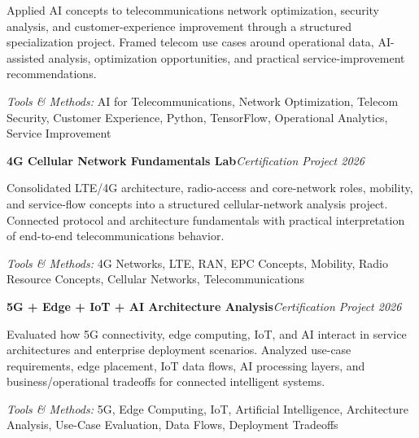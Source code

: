 \documentclass[9pt,letterpaper]{extarticle}
\newcommand{\entry}[2]{\Needspace{4\baselineskip}\textbf{#1}\hfill\textit{#2}\par}
\begin{document}
Applied AI concepts to telecommunications network optimization, security analysis, and customer-experience improvement through a structured specialization project. Framed telecom use cases around operational data, AI-assisted analysis, optimization opportunities, and practical service-improvement recommendations.\par
{\small\textit{Tools \& Methods:} AI for Telecommunications, Network Optimization, Telecom Security, Customer Experience, Python, TensorFlow, Operational Analytics, Service Improvement\par}
\vspace{1pt}
\entry{4G Cellular Network Fundamentals Lab}{Certification Project \textbar{} 2026}
Consolidated LTE/4G architecture, radio-access and core-network roles, mobility, and service-flow concepts into a structured cellular-network analysis project. Connected protocol and architecture fundamentals with practical interpretation of end-to-end telecommunications behavior.\par
{\small\textit{Tools \& Methods:} 4G Networks, LTE, RAN, EPC Concepts, Mobility, Radio Resource Concepts, Cellular Networks, Telecommunications\par}
\vspace{1pt}
\entry{5G + Edge + IoT + AI Architecture Analysis}{Certification Project \textbar{} 2026}
Evaluated how 5G connectivity, edge computing, IoT, and AI interact in service architectures and enterprise deployment scenarios. Analyzed use-case requirements, edge placement, IoT data flows, AI processing layers, and business/operational tradeoffs for connected intelligent systems.\par
{\small\textit{Tools \& Methods:} 5G, Edge Computing, IoT, Artificial Intelligence, Architecture Analysis, Use-Case Evaluation, Data Flows, Deployment Tradeoffs\par}
\vspace{1pt}
\end{document}
